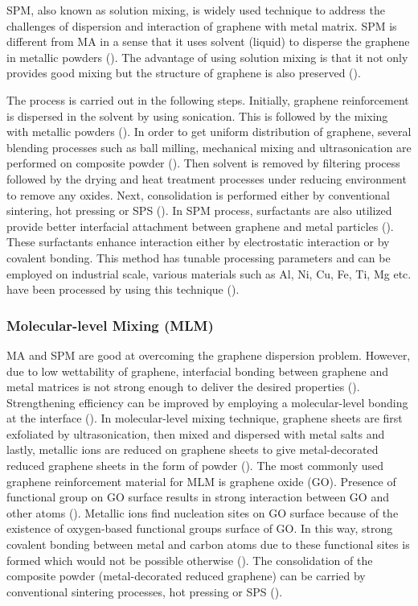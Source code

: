 SPM, also known as solution mixing, is widely used technique to address the challenges of dispersion and interaction of graphene with metal matrix.  SPM is different from MA in a sense that it uses solvent (liquid) to disperse the graphene in metallic powders (\cite{bhadauria2019combined, chen2012facile}). The advantage of using solution mixing is that it not only provides good mixing but the structure of graphene is also preserved (\cite{chen2012facile, wang2017graphene}). 

The process is carried out in the following steps. Initially, graphene reinforcement is dispersed in the solvent by using sonication. This is followed by the mixing with metallic powders (\cite{li2009large}). In order to get uniform distribution of graphene, several blending processes such as ball milling, mechanical mixing and ultrasonication are performed on composite powder (\cite{li2009large}). Then solvent is removed by filtering process followed by the drying and heat treatment processes under reducing environment to remove any oxides. Next, consolidation is performed either by conventional sintering, hot pressing or SPS (\cite{li2009large}). In SPM process, surfactants are also utilized provide better interfacial attachment between graphene and metal particles (\cite{li2009large}). These surfactants enhance interaction either by electrostatic interaction or by covalent bonding. This method has tunable processing parameters and can be employed on industrial scale, various materials such as Al, Ni, Cu, Fe, Ti, Mg etc. have been processed by using this technique (\cite{naseer2019review}). 

\subsubsection{Molecular-level Mixing (MLM)}

MA and SPM are good at overcoming the graphene dispersion problem. However, due to low wettability of graphene, interfacial bonding between graphene and metal matrices is not strong enough to deliver the desired properties (\cite{li2009large, clyne1995introduction}). Strengthening efficiency can be improved by employing a molecular-level bonding at the interface (\cite{hidalgo2017microstructure}). In molecular-level mixing technique, graphene sheets are first exfoliated by ultrasonication, then mixed and dispersed with metal salts and lastly, metallic ions are reduced on graphene sheets to give metal-decorated reduced graphene sheets in the form of powder (\cite{young2018mechanics}). The most commonly used graphene reinforcement material for MLM is graphene oxide (GO). Presence of functional group on GO surface results in strong interaction between GO and other atoms (\cite{suk2010mechanical, ruiz2011softened}). Metallic ions find nucleation sites on GO surface because of the existence of oxygen-based functional groups surface of GO. In this way, strong covalent bonding between metal and carbon atoms due to these functional sites is formed which would not be possible otherwise (\cite{nicholl2015effect}). The consolidation of the composite powder (metal-decorated reduced graphene) can be carried by conventional sintering processes, hot pressing or SPS (\cite{ahmad2007effect, oliver1992improved}).


